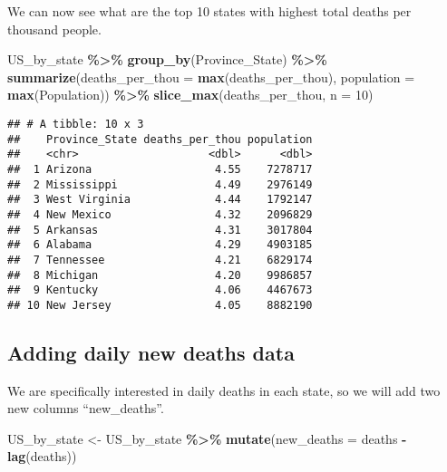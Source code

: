 \documentclass[
]{article}
\newenvironment{Shaded}{\begin{snugshade}}{\end{snugshade}}
\newcommand{\AttributeTok}[1]{\textcolor[rgb]{0.13,0.29,0.53}{#1}}
\newcommand{\DecValTok}[1]{\textcolor[rgb]{0.00,0.00,0.81}{#1}}
\newcommand{\FunctionTok}[1]{\textcolor[rgb]{0.13,0.29,0.53}{\textbf{#1}}}
\newcommand{\NormalTok}[1]{#1}
\newcommand{\OtherTok}[1]{\textcolor[rgb]{0.56,0.35,0.01}{#1}}
\newcommand{\SpecialCharTok}[1]{\textcolor[rgb]{0.81,0.36,0.00}{\textbf{#1}}}
\begin{document}
We can now see what are the top 10 states with highest total deaths per
thousand people.

\begin{Shaded}
\begin{Highlighting}[]
\NormalTok{US\_by\_state }\SpecialCharTok{\%\textgreater{}\%}
  \FunctionTok{group\_by}\NormalTok{(Province\_State) }\SpecialCharTok{\%\textgreater{}\%}
  \FunctionTok{summarize}\NormalTok{(}\AttributeTok{deaths\_per\_thou =} \FunctionTok{max}\NormalTok{(deaths\_per\_thou), }\AttributeTok{population =} \FunctionTok{max}\NormalTok{(Population)) }\SpecialCharTok{\%\textgreater{}\%}
  \FunctionTok{slice\_max}\NormalTok{(deaths\_per\_thou, }\AttributeTok{n =} \DecValTok{10}\NormalTok{)}
\end{Highlighting}
\end{Shaded}

\begin{verbatim}
## # A tibble: 10 x 3
##    Province_State deaths_per_thou population
##    <chr>                    <dbl>      <dbl>
##  1 Arizona                   4.55    7278717
##  2 Mississippi               4.49    2976149
##  3 West Virginia             4.44    1792147
##  4 New Mexico                4.32    2096829
##  5 Arkansas                  4.31    3017804
##  6 Alabama                   4.29    4903185
##  7 Tennessee                 4.21    6829174
##  8 Michigan                  4.20    9986857
##  9 Kentucky                  4.06    4467673
## 10 New Jersey                4.05    8882190
\end{verbatim}

\hypertarget{adding-daily-new-deaths-data}{%
\subsection{Adding daily new deaths
data}\label{adding-daily-new-deaths-data}}

We are specifically interested in daily deaths in each state, so we will
add two new columns ``new\_deaths''.

\begin{Shaded}
\begin{Highlighting}[]
\NormalTok{US\_by\_state }\OtherTok{\textless{}{-}}\NormalTok{ US\_by\_state }\SpecialCharTok{\%\textgreater{}\%}
  \FunctionTok{mutate}\NormalTok{(}\AttributeTok{new\_deaths =}\NormalTok{ deaths }\SpecialCharTok{{-}} \FunctionTok{lag}\NormalTok{(deaths))}
\end{Highlighting}
\end{Shaded}
\end{document}
